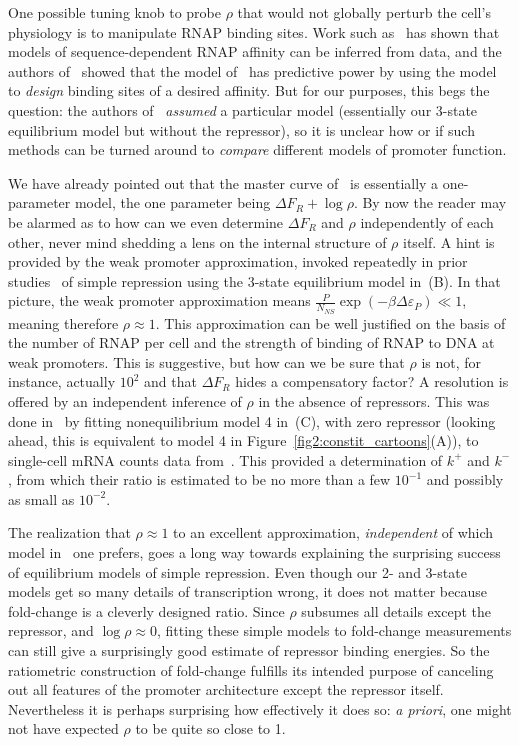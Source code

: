 One possible tuning knob to probe $\rho$ that would not globally perturb the
cell's physiology is to manipulate RNAP binding sites. Work such
as~\cite{Kinney2010} has shown that models of sequence-dependent RNAP affinity can be
inferred from data, and the authors of~\cite{Brewster2012} showed that the model
of~\cite{Kinney2010} has predictive power by using the model to \textit{design}
binding sites of a desired affinity. But for our purposes, this begs the
question: the authors of~\cite{Kinney2010} \textit{assumed} a particular model
(essentially our 3-state equilibrium model but without the repressor), so it is
unclear how or if such methods can be turned around to \textit{compare}
different models of promoter function.

We have already pointed out that the master curve of~
is essentially a one-parameter model, the one parameter being $\Delta F_R +
\log\rho$. By now the reader may be alarmed as to how can we even determine
$\Delta F_R$ and $\rho$ independently of each other, never mind shedding a lens
on the internal structure of $\rho$ itself. A hint is provided by the weak
promoter approximation, invoked repeatedly in prior studies~\cite{Bintu2005c,
Garcia2011a, Razo-Mejia2018} of simple repression using the 3-state equilibrium
model in~(B). In that picture, the weak promoter
approximation means $\frac{P}{N_{NS}}\exp(-\beta\Delta\varepsilon_P) \ll 1$,
meaning therefore $\rho\approx1$.  This approximation can be well justified on
the basis of the number of RNAP per cell and the strength of binding of RNAP to
DNA at weak promoters. This is suggestive, but how can we be sure that $\rho$ is
not, for instance, actually $10^2$ and that $\Delta F_R$ hides a compensatory
factor? A resolution is offered by an independent inference of $\rho$ in the
absence of repressors. This was done in~\cite{Razo-Mejia2020} by fitting
nonequilibrium model 4 in~(C), with zero repressor
(looking ahead, this is equivalent to model 4
in Figure~\ref{fig2:constit_cartoons}(A)),
to single-cell mRNA counts data from~\cite{Brewster2014}. This provided a
determination of $k^+$ and $k^-$, from which their ratio is estimated to be no
more than a few $10^{-1}$ and possibly as small as $10^{-2}$.

The realization that $\rho\approx1$ to an excellent approximation,
\textit{independent} of which model in~ one prefers,
goes a long way towards explaining the surprising success of equilibrium models
of simple repression. Even though our 2- and 3-state models get so many details
of transcription wrong, it does not matter because fold-change is a cleverly
designed ratio. Since $\rho$ subsumes all details except the repressor, and
$\log\rho\approx0$, fitting these simple models to fold-change measurements can
still give a surprisingly good estimate of repressor binding energies. So the
ratiometric construction of fold-change fulfills its intended purpose of
canceling out all features of the promoter architecture except the repressor
itself. Nevertheless it is perhaps surprising how effectively it does so:
\textit{a priori}, one might not have expected $\rho$ to be quite so close to 1.

